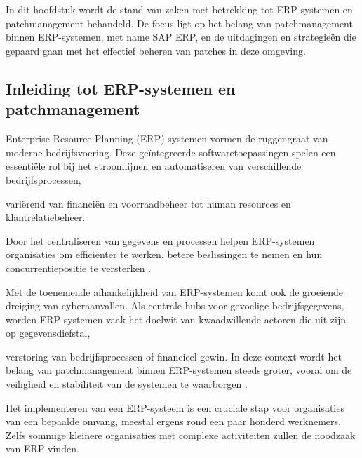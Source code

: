 \chapter{}
\label{ch:stand-van-zaken}


In dit hoofdstuk wordt de stand van zaken met betrekking tot ERP-systemen en patchmanagement behandeld. De focus ligt op het belang van patchmanagement binnen ERP-systemen, met name SAP ERP, en de uitdagingen en strategieën die gepaard gaan met het effectief beheren van patches in deze omgeving.

\section{Inleiding tot ERP-systemen en patchmanagement}
Enterprise Resource Planning (ERP) systemen vormen de ruggengraat van moderne bedrijfsvoering. Deze geïntegreerde softwaretoepassingen spelen een essentiële rol bij het stroomlijnen en automatiseren van verschillende bedrijfsprocessen, 

variërend van financiën en voorraadbeheer tot human resources en klantrelatiebeheer.

Door het centraliseren van gegevens en processen helpen ERP-systemen organisaties om efficiënter te werken, betere beslissingen te nemen en hun concurrentiepositie te versterken \autocite{StatistiekVlaanderen2022}.

Met de toenemende afhankelijkheid van ERP-systemen komt ook de groeiende dreiging van cyberaanvallen. Als centrale hubs voor gevoelige bedrijfsgegevens, worden ERP-systemen vaak het doelwit van kwaadwillende actoren die uit zijn op gegevensdiefstal, 

verstoring van bedrijfsprocessen of financieel gewin. In deze context wordt het belang van patchmanagement binnen ERP-systemen steeds groter, vooral om de veiligheid en stabiliteit van de systemen te waarborgen \autocite{Pearson2024}.

Het implementeren van een ERP-systeem is een cruciale stap voor organisaties van een bepaalde omvang, meestal ergens rond een paar honderd werknemers. Zelfs sommige kleinere organisaties met complexe activiteiten zullen de noodzaak van ERP vinden.

